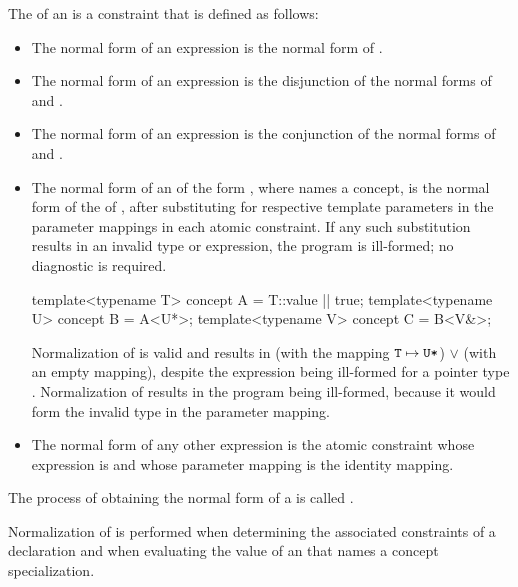 \pnum
The  of an   is
a constraint that is defined as follows:
%
\begin{itemize}
\item
The normal form of an expression  is
the normal form of .

\item
The normal form of an expression  is
the disjunction of
the normal forms of  and .

\item
The normal form of an expression 
is the conjunction of
the normal forms of  and .

\item
The normal form of an  of the form
, where  names a concept,
is the normal form of the  of ,
after substituting  for
 respective template parameters in the
parameter mappings in each atomic constraint.
If any such substitution results in an invalid type or expression,
the program is ill-formed; no diagnostic is required.
\begin{example}
\begin{codeblock}
template<typename T> concept A = T::value || true;
template<typename U> concept B = A<U*>;
template<typename V> concept C = B<V&>;
\end{codeblock}
Normalization of  
is valid and results in
 (with the mapping $\texttt{T} \mapsto \texttt{U*}$)
$\lor$
 (with an empty mapping),
despite the expression  being ill-formed
for a pointer type .
Normalization of  
results in the program being ill-formed,
because it would form the invalid type 
in the parameter mapping.
\end{example}

\item
The normal form of any other expression  is
the atomic constraint
whose expression is  and
whose parameter mapping is the identity mapping.
\end{itemize}

\pnum
The process of obtaining the normal form of a
is called
.
\begin{note}
Normalization of 
is performed
when determining the associated constraints
of a declaration
and
when evaluating the value of an 
that names a concept specialization.
\end{note}

